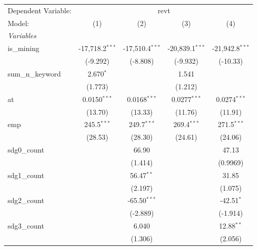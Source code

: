 
\begingroup
\centering
\begin{tabular}{lcccc}
   \tabularnewline \midrule \midrule
   Dependent Variable: & \multicolumn{4}{c}{revt}\\
   Model:            & (1)               & (2)               & (3)               & (4)\\  
   \midrule
   \emph{Variables}\\
   is\_mining        & -17,718.2$^{***}$ & -17,510.4$^{***}$ & -20,839.1$^{***}$ & -21,942.8$^{***}$\\   
                     & (-9.292)          & (-8.808)          & (-9.932)          & (-10.33)\\   
   sum\_n\_keyword   & 2.670$^{*}$       &                   & 1.541             &   \\   
                     & (1.773)           &                   & (1.212)           &   \\   
   at                & 0.0150$^{***}$    & 0.0168$^{***}$    & 0.0277$^{***}$    & 0.0274$^{***}$\\   
                     & (13.70)           & (13.33)           & (11.76)           & (11.91)\\   
   emp               & 245.5$^{***}$     & 249.7$^{***}$     & 269.4$^{***}$     & 271.5$^{***}$\\   
                     & (28.53)           & (28.30)           & (24.61)           & (24.06)\\   
   sdg0\_count       &                   & 66.90             &                   & 47.13\\   
                     &                   & (1.414)           &                   & (0.9969)\\   
   sdg1\_count       &                   & 56.47$^{**}$      &                   & 31.85\\   
                     &                   & (2.197)           &                   & (1.075)\\   
   sdg2\_count       &                   & -65.50$^{***}$    &                   & -42.51$^{*}$\\   
                     &                   & (-2.889)          &                   & (-1.914)\\   
   sdg3\_count       &                   & 6.040             &                   & 12.88$^{**}$\\   
                     &                   & (1.306)           &                   & (2.056)\\   

\end{tabular}
